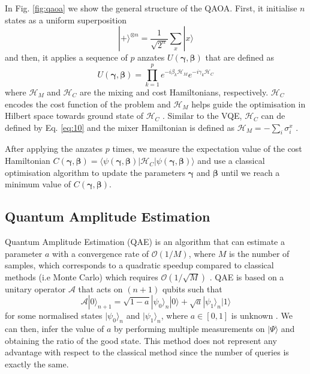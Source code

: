 \documentclass[prx,twocolumn,floatfix,superscriptaddress,longbibliography]{revtex4-1}
\begin{document}
In Fig. \ref{fig:qaoa} we show the general structure of the QAOA. First, it initialise $n$ states as a uniform superposition
\begin{equation}
  \label{eq:15}
  |+\rangle^{\otimes n} = \frac{1}{\sqrt{2^n}} \sum_{x} |x\rangle 
\end{equation}
and then, it applies a sequence of $p$ anzates $U(\boldsymbol{\gamma}, \boldsymbol{\beta})$  that are defined as 
\begin{equation}
  \label{eq:16}
  U(\boldsymbol{\gamma}, \boldsymbol{\beta}) = \prod_{k=1}^{p} e^{-i\beta_k \mathcal{H}_M} e^{-i\gamma_k \mathcal{H}_C}
\end{equation}
where $\mathcal{H}_M$ and $\mathcal{H}_C$ are the mixing and cost Hamiltonians, respectively. $\mathcal{H}_C$ encodes the cost function of the problem and $\mathcal{H}_M$ helps guide the optimisation in Hilbert space towards ground state of $\mathcal{H}_C$ \cite{Moll2018}. Similar to the VQE, $\mathcal{H}_C$ can de defined by Eq. \ref{eq:10} and the mixer Hamiltonian 
is defined as $\mathcal{H}_M = -\sum_{i} \sigma_i^x$ \cite{Moll2018}.

After applying the anzates $p$ times, we measure the expectation value of the cost Hamiltonian $C(\boldsymbol{\gamma},\boldsymbol{\beta}) = \langle \psi(\boldsymbol{\gamma}, \boldsymbol{\beta})|\mathcal{H}_C|\psi(\boldsymbol{\gamma},\boldsymbol{\beta})\rangle$ and use a classical optimisation algorithm to update the parameters $\boldsymbol{\gamma}$ and $\boldsymbol{\beta}$ until we reach a minimum value of $C(\boldsymbol{\gamma},\boldsymbol{\beta})$.

\subsection{Quantum Amplitude Estimation}

Quantum Amplitude Estimation (QAE) is an algorithm that can estimate a parameter $a$ with a convergence rate of $\mathcal{O}(1/M)$, where $M$ is the number of samples, which corresponds to a quadratic speedup compared to classical methods (i.e Monte Carlo) which requires $\mathcal{O}(1/\sqrt{M})$ \cite{Egger2020}.  QAE is based on a unitary operator $\mathcal{A}$  that acts on $(n+1)$ qubits such that 
\begin{equation}
  \label{eq:17}
  \mathcal{A}|0\rangle_{n+1} = \sqrt{1-a}|\psi_0\rangle_n|0\rangle + \sqrt{a}|\psi_1\rangle_n|1\rangle
\end{equation}
for some normalised states $|\psi_0\rangle_n$ and $|\psi_1\rangle_n$, where $a \in [0,1]$ is unknown \cite{Stamatopoulos2020}. We can then, 
infer the value of $a$ by performing multiple measurements on $|\Psi\rangle$ and obtaining the ratio of the good state. This method does not represent any advantage with respect to the classical method since the number of queries is exactly the same.  
\end{document}
